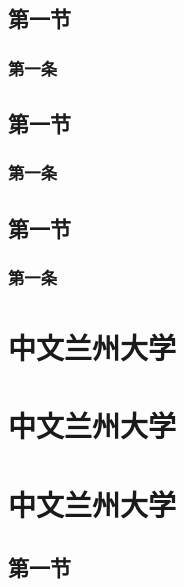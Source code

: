 \documentclass{LZU}
\begin{document}
\section{第一节}
\subsection{第一条}
\section{第一节}
\subsection{第一条}
\section{第一节}
\subsection{第一条}
\chapter{中文兰州大学}
\chapter{中文兰州大学}
\chapter{中文兰州大学}
\section{第一节}
\end{document}
